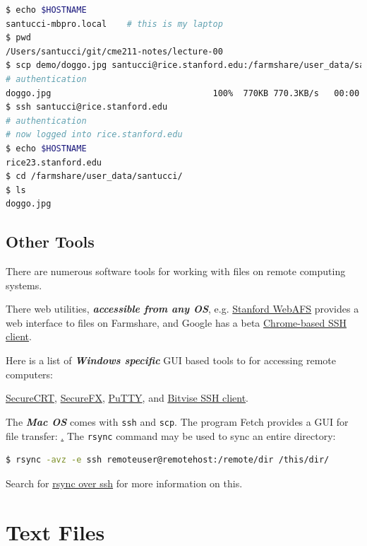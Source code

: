\documentclass[12pt,letterpaper,twoside]{article}
\begin{document}
{
  \footnotesize
\begin{lstlisting}[language=bash]
$ echo $HOSTNAME
santucci-mbpro.local    # this is my laptop
$ pwd
/Users/santucci/git/cme211-notes/lecture-00
$ scp demo/doggo.jpg santucci@rice.stanford.edu:/farmshare/user_data/santucci/
# authentication
doggo.jpg                                100%  770KB 770.3KB/s   00:00
$ ssh santucci@rice.stanford.edu
# authentication
# now logged into rice.stanford.edu
$ echo $HOSTNAME
rice23.stanford.edu
$ cd /farmshare/user_data/santucci/
$ ls
doggo.jpg
\end{lstlisting}
}


\vspace{-8pt}
\subsection{Other Tools}
\label{ssh_tools}
There are numerous software tools for working with files on remote computing
systems.

There web utilities, \textbf{\emph{accessible from any OS}},
e.g.
\href{https://afs.stanford.edu/}{Stanford WebAFS} provides a web interface to
files on Farmshare, and Google has a beta
\href{https://chrome.google.com/webstore/detail/secure-shell-app/pnhechapfaindjhompbnflcldabbghjo?hl=en}{Chrome-based SSH client}.

Here is a list of \textbf{\emph{Windows specific}} GUI based
tools to for accessing remote computers:

\href{https://uit.stanford.edu/software/securecrt}{SecureCRT},
\href{https://uit.stanford.edu/software/securefx}{SecureFX},
\href{http://www.chiark.greenend.org.uk/~sgtatham/putty/download.html}{PuTTY}, and
\href{https://www.bitvise.com/ssh-client}{Bitvise SSH client}.

The \textbf{\emph{Mac OS}} comes with \texttt{ssh} and \texttt{scp}.  The program Fetch provides a GUI for file
transfer: \href{https://uit.stanford.edu/software/fetch}.  The \texttt{rsync} command may
be used to sync an entire directory:

\begin{lstlisting}[language=bash]
$ rsync -avz -e ssh remoteuser@remotehost:/remote/dir /this/dir/
\end{lstlisting}

Search for \href{https://www.google.com/webhp?q=rsync%20over%20ssh#safe=off&q=rsync+over+ssh}{rsync over ssh} for more information on this.

\vspace{-8pt}
\section{Text Files}
\vspace{-8pt}
\end{document}
